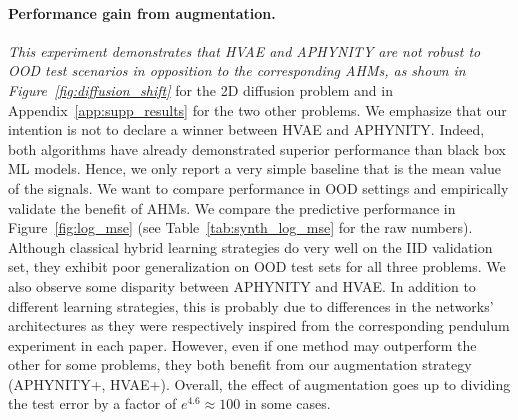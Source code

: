 \documentclass{article}
\newcommand\figref{Figure~\ref}
\newcommand\tabref{Table~\ref}
\newcommand\appref{Appendix~\ref}
\begin{document}
\paragraph{Performance gain from augmentation.}
\textit{This experiment demonstrates that HVAE and APHYNITY are not robust to OOD test scenarios in opposition to the corresponding AHMs, as shown in \figref{fig:diffusion_shift}} for the 2D diffusion problem and in \appref{app:supp_results} for the two other problems. We emphasize that our intention is not to declare a winner between HVAE and APHYNITY. Indeed, both algorithms have already demonstrated superior performance than black box ML models. Hence, we only report a very simple baseline that is the mean value of the signals. We want to compare performance in OOD settings and empirically validate the benefit of AHMs.
We compare the predictive performance in \figref{fig:log_mse} (see \tabref{tab:synth_log_mse} for the raw numbers).  Although classical hybrid learning strategies do very well on the IID validation set, they exhibit poor generalization on OOD test sets for all three problems. We also observe some disparity between APHYNITY and HVAE. In addition to different learning strategies, this is probably due to differences in the networks' architectures as they were respectively inspired from the corresponding pendulum experiment in each paper. However, even if one method may outperform the other for some problems, they both benefit from our augmentation strategy (APHYNITY+, HVAE+). Overall, the effect of augmentation goes up to dividing the test error by a factor of $e^{4.6}\approx 100$ in some cases. 
\end{document}
